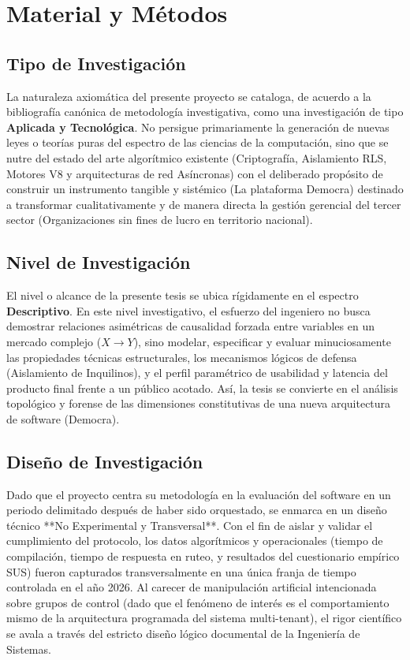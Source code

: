 \documentclass[11pt,a4paper,oneside]{report}
\begin{document}
\chapter{Material y M\'etodos}

\section{Tipo de Investigaci\'on}
La naturaleza axiom\'atica del presente proyecto se cataloga, de acuerdo a la bibliograf\'ia can\'onica de metodolog\'ia investigativa, como una investigaci\'on de tipo \textbf{Aplicada y Tecnol\'ogica}. No persigue primariamente la generaci\'on de nuevas leyes o teor\'ias puras del espectro de las ciencias de la computaci\'on, sino que se nutre del estado del arte algor\'itmico existente (Criptograf\'ia, Aislamiento RLS, Motores V8 y arquitecturas de red As\'incronas) con el deliberado prop\'osito de construir un instrumento tangible y sist\'emico (La plataforma Democra) destinado a transformar cualitativamente y de manera directa la gesti\'on gerencial del tercer sector (Organizaciones sin fines de lucro en territorio nacional).

\section{Nivel de Investigaci\'on}
El nivel o alcance de la presente tesis se ubica r\'igidamente en el espectro \textbf{Descriptivo}. En este nivel investigativo, el esfuerzo del ingeniero no busca demostrar relaciones asim\'etricas de causalidad forzada entre variables en un mercado complejo ($X \rightarrow Y$), sino modelar, especificar y evaluar minuciosamente las propiedades t\'ecnicas estructurales, los mecanismos l\'ogicos de defensa (Aislamiento de Inquilinos), y el perfil param\'etrico de usabilidad y latencia del producto final frente a un p\'ublico acotado. As\'i, la tesis se convierte en el an\'alisis topol\'ogico y forense de las dimensiones constitutivas de una nueva arquitectura de software (Democra).

\section{Dise\~no de Investigaci\'on}
Dado que el proyecto centra su metodolog\'ia en la evaluaci\'on del software en un periodo delimitado despu\'es de haber sido orquestado, se enmarca en un dise\~no t\'ecnico **No Experimental y Transversal**. Con el fin de aislar y validar el cumplimiento del protocolo, los datos algor\'itmicos y operacionales (tiempo de compilaci\'on, tiempo de respuesta en ruteo, y resultados del cuestionario emp\'irico SUS) fueron capturados transversalmente en una \'unica franja de tiempo controlada en el a\~no 2026. Al carecer de manipulaci\'on artificial intencionada sobre grupos de control (dado que el fen\'omeno de inter\'es es el comportamiento mismo de la arquitectura programada del sistema multi-tenant), el rigor cient\'ifico se avala a trav\'es del estricto dise\~no l\'ogico documental de la Ingenier\'ia de Sistemas.
\end{document}
